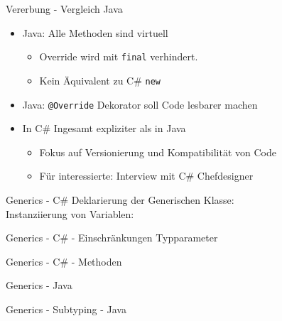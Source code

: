 \documentclass[11pt]{beamer}
\begin{document}
\begin{frame}{Vererbung - Vergleich Java}
	
	\begin{itemize}
		\item Java: Alle Methoden sind virtuell
		\begin{itemize}
			\item Override wird mit \texttt{final} verhindert.
			\item Kein Äquivalent zu C\# \texttt{new}
		\end{itemize}
		\item Java: \texttt{@Override} Dekorator soll Code lesbarer machen
		\item In C\# Ingesamt expliziter als in Java
		\begin{itemize}
			\item Fokus auf Versionierung und Kompatibilität von Code
			\item Für interessierte: Interview mit C\# Chefdesigner \cite{interview_virtual}
		\end{itemize}
	\end{itemize}

\end{frame}


\begin{frame}{Generics - C\#}
	Deklarierung der Generischen Klasse: \\
	Instanziierung von Variablen: \\
\end{frame}

\begin{frame}{Generics - C\# - Einschränkungen Typparameter}
\end{frame}

\begin{frame}{Generics - C\# - Methoden}
\end{frame}


\begin{frame}{Generics - Java}
\end{frame}

\begin{frame}{Generics - Subtyping - Java}
\end{frame}
\end{document}
